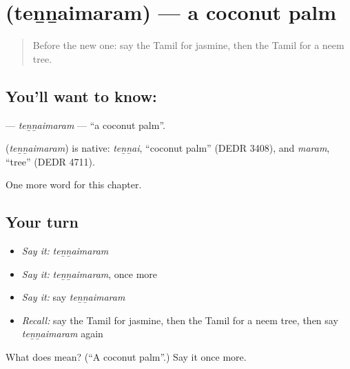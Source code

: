 \section[\texorpdfstring{\ta{தென்னைமரம்} (teṉṉaimaram)}{தென்னைமரம் (teṉṉaimaram)}]{ (teṉṉaimaram) — a coconut palm}

\label{lesson:TA-C188-tennaimaram}



\begin{quote}
Before the new one: say the Tamil for jasmine, then the Tamil for a neem tree.
\end{quote}

\subsection*{You'll want to know: }
\textbf{} — \emph{teṉṉaimaram} — \textquotedblleft{}a coconut palm\textquotedblright{}.

\begin{cousinweb}
\textbf{} (\emph{teṉṉaimaram}) is native: \emph{teṉṉai}, \textquotedblleft{}coconut palm\textquotedblright{} (DEDR 3408), and \emph{maram}, \textquotedblleft{}tree\textquotedblright{} (DEDR 4711).
\end{cousinweb}

\begin{grammarlens}[title={What you've built}]
One more word for this chapter.
\end{grammarlens}

\subsection*{Your turn}
\begin{itemize}
\raggedright
  \item \emph{Say it:} \emph{teṉṉaimaram}
  \item \emph{Say it:} \emph{teṉṉaimaram}, once more
  \item \emph{Say it:} say \emph{teṉṉaimaram}
  \item \emph{Recall:} say the Tamil for jasmine, then the Tamil for a neem tree, then say \emph{teṉṉaimaram} again
\end{itemize}

\begin{tcolorbox}[breakable,colback=teal!4,colframe=teal!35!black,title={Before you move on}]
What does  mean? (\textquotedblleft{}A coconut palm\textquotedblright{}.) Say it once more.
\end{tcolorbox}
